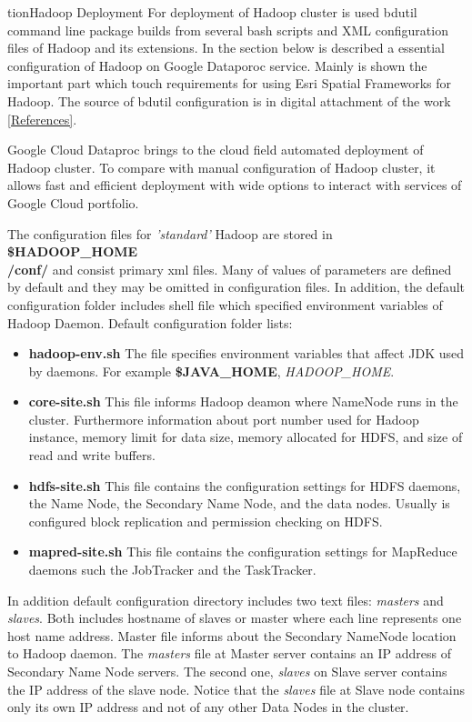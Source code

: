 \documentclass[a4paper,12pt,oneside]{report}
\begin{document}
tion{Hadoop Deployment}\label{hadoop_deployment}
	For deployment of Hadoop cluster is used bdutil command line package builds from
	several bash scripts and XML configuration files of Hadoop and its extensions. 
	In the section below is described a essential configuration of Hadoop on Google Dataporoc 
	service. Mainly is shown the important part which touch requirements for using
	Esri Spatial Frameworks for Hadoop. The source of bdutil configuration  is in digital attachment of the work \ref{References}.
	
	Google Cloud Dataproc brings to the cloud field automated deployment of Hadoop
	cluster. To compare with manual configuration of Hadoop cluster, it allows fast and efficient
	deployment with wide options to interact with services of Google Cloud portfolio.
	
	The configuration files for \textit{'standard'} Hadoop are stored in
	\textbf{\$HADOOP\_HOME\\/conf/} and consist  primary xml files. Many of values of 
	parameters are defined by default and they may be omitted in configuration files. 
	In addition, the default configuration folder  includes shell file which specified environment variables of Hadoop Daemon. Default configuration folder lists:
	\begin{itemize}\label{conf_files}
		\item \textbf{hadoop-env.sh} The file specifies environment variables that
		affect JDK used by daemons. For example \textbf{\$JAVA\_HOME}, \textit{HADOOP\_HOME}.
		\item \textbf{core-site.sh}   This file informs Hadoop deamon where NameNode
		runs in the cluster. Furthermore 
		information about port number used for Hadoop instance, memory limit for data
		size,  memory allocated for HDFS, and size of read and write buffers.
		\item \textbf{hdfs-site.sh}  This file contains the configuration settings for
		HDFS daemons, the Name Node, the Secondary Name Node, and the data nodes. 
		Usually is configured block	replication and permission checking on HDFS. 
		\item \textbf{mapred-site.sh}  This file contains the configuration settings for
		MapReduce daemons such the JobTracker and the TaskTracker.
	\end{itemize}
	
	In addition default configuration directory includes two text files:
	\textit{masters} and \textit{slaves}. Both includes hostname of slaves or master 
	where each line represents one host name address. 
	Master file informs about the Secondary NameNode location to Hadoop daemon. The
	\textit{masters} file at Master server contains an IP address of Secondary Name Node servers.
	The second one, \textit{slaves} on Slave server contains the IP address of the
	slave node. Notice that the \textit{slaves} file at Slave node contains only its
	own IP address and not of any other Data Nodes in the cluster.
	
\end{document}
